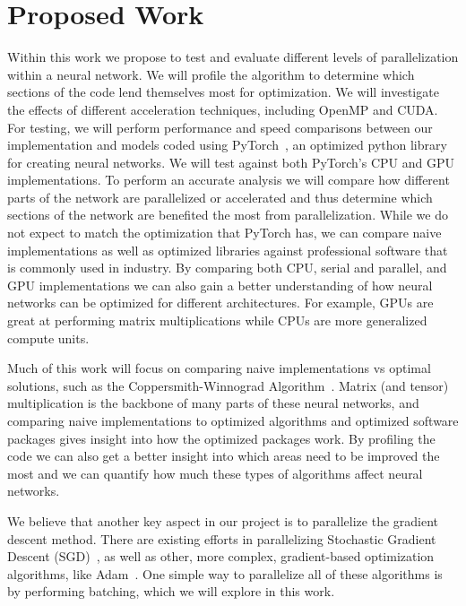 \documentclass[10pt,twocolumn,letterpaper]{article}
\begin{document}
\section{Proposed Work}
%
Within this work we propose to test and evaluate different levels of parallelization within a neural network.
We will profile the algorithm to determine which sections of the code lend themselves most for optimization.
We will investigate the effects of different acceleration techniques, including OpenMP and CUDA.
For testing, we will perform performance and speed comparisons between our implementation and models coded using PyTorch~\cite{paszke2017automatic}, an optimized python library for creating neural networks. We will test against both PyTorch's CPU and GPU implementations.
To perform an accurate analysis we will compare how different parts of the network are parallelized or accelerated and thus determine which sections of the network are benefited the most from parallelization.
While we do not expect to match the optimization that PyTorch has, we can compare naive implementations as well as optimized libraries against professional software that is commonly used in industry.
By comparing both CPU, serial and parallel, and GPU implementations we can also gain a better understanding of how neural networks can be optimized for different architectures.
For example, GPUs are great at performing matrix multiplications while CPUs are more generalized compute units.

Much of this work will focus on comparing naive implementations vs optimal solutions, such as the Coppersmith-Winnograd Algorithm~\cite{COPPERSMITH1990251}. 
Matrix (and tensor) multiplication is the backbone of many parts of these neural networks, and comparing naive implementations to optimized algorithms and optimized software packages gives
insight into how the optimized packages work. 
By profiling the code we can also get a better insight into which areas need to be improved the most and we can quantify how much these types of algorithms affect neural networks. 

We believe that another key aspect in our project is to parallelize the gradient descent method.
There are existing efforts in parallelizing Stochastic Gradient Descent (SGD)~\cite{10.5555/2997046.2997185}, as well as other, more complex, gradient-based optimization algorithms, like  Adam~\cite{DBLP:journals/corr/KingmaB14}. 
One simple way to parallelize all of these algorithms is by performing batching, which we will explore in this work. 
\end{document}
